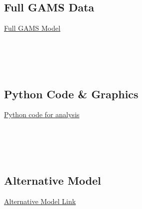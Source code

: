 \subsection{Full GAMS Data}
\href{https://zenodo.org/records/15250066?token=eyJhbGciOiJIUzUxMiJ9.eyJpZCI6ImQ0YTVlZDAzLWU0NDktNDkyYS1iZGNlLTZjMTc3YWNmM2Y3ZCIsImRhdGEiOnt9LCJyYW5kb20iOiJhMDhlZTcwOTU3MjFiZmExMGY0YmUzMjUwZGM2ZjY5ZCJ9.RLOwEcGXlgFzX0IFm-1bEa9GjshtvCu_SmehFOBJg8yQ11NlqWq_4L8OuvG4eeULVS_BRhnSywxuA7vsCfTH9w}{Full GAMS Model}\\

\texttt{}\\
\texttt{}\\
\texttt{}\\
\texttt{}\\
\texttt{}

\subsection{Python Code \& Graphics}
\href{https://zenodo.org/records/15250072?token=eyJhbGciOiJIUzUxMiJ9.eyJpZCI6ImNmZDY2ZTRmLThiZjctNDI2Yy1hMjkzLWI5NDZkYmVkMTllNSIsImRhdGEiOnt9LCJyYW5kb20iOiJhNjI4MWVmYmJiMGViZTYzOTU0ZDVjMTRmNDU4MWJiMCJ9.uA9bX6OLFf9Pp2ubAHRNnt2GhgJh5wo5rXNeOsO-d_enloZMZBcsV4rCj-NJIkZboyPzi6s5PkMfnyhZUCjNkQ}{Python code for analysis}\\

\texttt{}\\
\texttt{}\\
\texttt{}\\
\texttt{}\\
\texttt{}

\subsection{Alternative Model}
\label{app:altModel}
\href{https://zenodo.org/records/15250055?token=eyJhbGciOiJIUzUxMiJ9.eyJpZCI6IjE1YWFjM2QxLWJmOTItNDliOS1iNDY4LWZmODkyNjY1OWRiNiIsImRhdGEiOnt9LCJyYW5kb20iOiI3ZGI5YjEyODgyNzgxYzdhNGE5Zjc1NWIwOWVhN2YxNSJ9.FBCfOpGd3SIIQKDdfnO6MmOsvnNoW9iQm4AwVD-54T6XpgzppI0E8JzMH1Oq6b0KZh-11kKp2PpRsM_fNMbOnQ}{Alternative Model Link}\\

